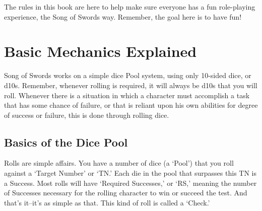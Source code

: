 \documentclass[oneside,11pt,english]{book}
\begin{document}
The rules in this book are here to help make sure everyone has a fun role-playing experience, the Song of Swords way. Remember, the goal here is to have fun! 
\section{Basic Mechanics Explained}
Song of Swords works on a simple dice Pool system, using only 10-sided dice, or d10s. Remember, 
whenever rolling is required, it will always be d10s that you will roll. Whenever there is a situation in 
which a character must accomplish a task that has some chance of failure, or that is reliant upon his own 
abilities for degree of success or failure, this is done through rolling dice. 
\subsection{Basics of the Dice Pool}
Rolls are simple affairs. You have a number of dice (a ‘Pool’) that you roll against a ‘Target Number’ or 
‘TN.’ Each die in the pool that surpasses this TN is a Success. 
Most rolls will have ‘Required Successes,’ or ‘RS,’ meaning the number of Successes necessary for the 
rolling character to win or succeed the test. And that’s it--it’s as simple as that. This kind of roll is called a ‘Check.’ 
\end{document}
